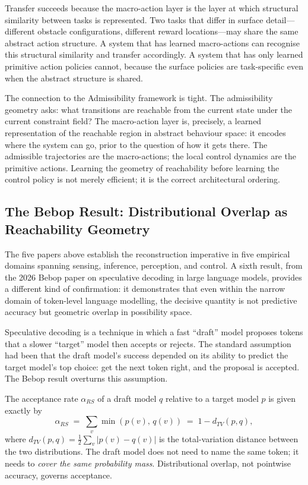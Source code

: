 \documentclass[12pt, letterpaper]{article}
\theoremstyle{remark}
\begin{document}
Transfer succeeds because the macro-action layer is the layer at which
structural similarity between tasks is represented.  Two tasks that differ
in surface detail---different obstacle configurations, different reward
locations---may share the same abstract action structure.  A system that
has learned macro-actions can recognise this structural similarity and
transfer accordingly.  A system that has only learned primitive action
policies cannot, because the surface policies are task-specific even when
the abstract structure is shared.

The connection to the Admissibility framework is tight.  The admissibility
geometry asks: what transitions are reachable from the current state under
the current constraint field?  The macro-action layer is, precisely, a
learned representation of the reachable region in abstract behaviour space:
it encodes where the system can go, prior to the question of how it gets
there.  The admissible trajectories are the macro-actions; the local control
dynamics are the primitive actions.  Learning the geometry of reachability
before learning the control policy is not merely efficient; it is the correct
architectural ordering.

\subsection{The Bebop Result: Distributional Overlap as Reachability Geometry}

The five papers above establish the reconstruction imperative in five
empirical domains spanning sensing, inference, perception, and control.
A sixth result, from the 2026 Bebop paper on speculative decoding in large
language models, provides a different kind of confirmation: it demonstrates
that even within the narrow domain of token-level language modelling, the
decisive quantity is not predictive accuracy but geometric overlap in
possibility space.

Speculative decoding is a technique in which a fast ``draft'' model proposes
tokens that a slower ``target'' model then accepts or rejects.  The standard
assumption had been that the draft model's success depended on its ability
to predict the target model's top choice: get the next token right, and the
proposal is accepted.  The Bebop result overturns this assumption.

The acceptance rate $\alpha_{RS}$ of a draft model $q$ relative to a target
model $p$ is given exactly by
\begin{equation}
  \alpha_{RS}
  \;=\;
  \sum_v \min(p(v),\, q(v))
  \;=\;
  1 - d_{TV}(p, q),
  \label{eq:bebop}
\end{equation}
where $d_{TV}(p, q) = \tfrac{1}{2}\sum_v |p(v) - q(v)|$ is the
total-variation distance between the two distributions.  The draft model
does not need to name the same token; it needs to \emph{cover the same
probability mass}.  Distributional overlap, not pointwise accuracy, governs
acceptance.
\end{document}
